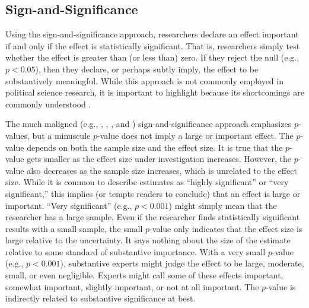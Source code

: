 \documentclass[12pt]{article}
\begin{document}

\subsection*{Sign-and-Significance}

Using the sign-and-significance approach, researchers declare an effect important if and only if the effect is statistically significant. That is, researchers simply test whether the effect is greater than (or less than) zero. If they reject the null (e.g., $p < 0.05$), then they declare, or perhaps subtly imply, the effect to be substantively meaningful. While this approach is not commonly employed in political science research, it is important to highlight because its shortcomings are commonly understood \citep{Gill1999}.

The much maligned (e.g., \citealt{Cohen1990}, \citealt{Gill1999}, \citealt{HillJones2014}, and \citealt{Gross2014}) sign-and-significance approach emphasizes $p$-values, but a minuscule $p$-value does not imply a large or important effect. The $p$-value depends on both the sample size and the effect size. It is true that the $p$-value gets smaller as the effect size under investigation increases. However, the $p$-value also decreases as the sample size increases, which is unrelated to the effect size. While it is common to describe estimates as ``highly significant'' or ``very significant,'' this implies (or tempts readers to conclude) that an effect is large or important. ``Very significant'' (e.g., $p < 0.001$) might simply mean that the researcher has a large sample. Even if the researcher finds statistically significant results with a small sample, the small $p$-value only indicates that the effect size is large relative to the uncertainty. It says nothing about the size of the estimate relative to some standard of substantive importance. With a very small $p$-value (e.g., $p < 0.001$), substantive experts might judge the effect to be large, moderate, small, or even negligible. Experts might call some of these effects important, somewhat important, slightly important, or not at all important. The $p$-value is indirectly related to substantive significance at best.
\end{document}
